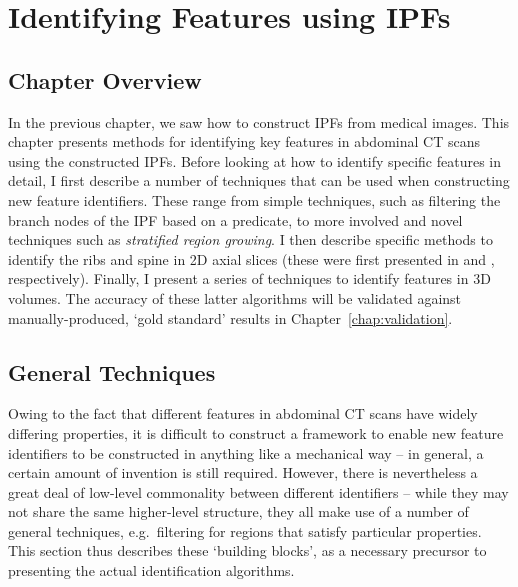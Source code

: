 \chapter{Identifying Features using IPFs}
\label{chap:featureid}

\section{Chapter Overview}

In the previous chapter, we saw how to construct IPFs from medical images. This chapter presents methods for identifying key features in abdominal CT scans using the constructed IPFs. Before looking at how to identify specific features in detail, I first describe a number of techniques that can be used when constructing new feature identifiers. These range from simple techniques, such as filtering the branch nodes of the IPF based on a predicate, to more involved and novel techniques such as \emph{stratified region growing}. I then describe specific methods to identify the ribs and spine in 2D axial slices (these were first presented in \cite{gvccimi08} and \cite{gvcispa09}, respectively). Finally, I present a series of techniques to identify features in 3D volumes. The accuracy of these latter algorithms will be validated against manually-produced, `gold standard' results in Chapter~\ref{chap:validation}.

\section{General Techniques}

Owing to the fact that different features in abdominal CT scans have widely differing properties, it is difficult to construct a framework to enable new feature identifiers to be constructed in anything like a mechanical way -- in general, a certain amount of invention is still required. However, there is nevertheless a great deal of low-level commonality between different identifiers -- while they may not share the same higher-level structure, they all make use of a number of general techniques, e.g.~filtering for regions that satisfy particular properties. This section thus describes these `building blocks', as a necessary precursor to presenting the actual identification algorithms.

